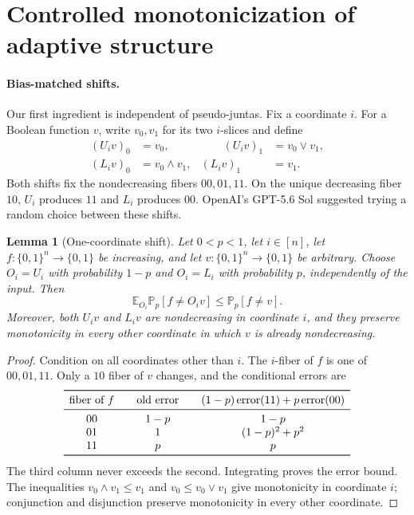 \documentclass[11pt,letterpaper]{article}
\newtheorem{lemma}[theorem]{Lemma}
\theoremstyle{definition}
\theoremstyle{remark}
\newcommand{\bits}{\{0,1\}}
\newcommand{\E}{\mathbb E}
\renewcommand{\Pr}{\mathbb P}
\begin{document}
\section{Controlled monotonicization of adaptive structure}
\label{sec:monotonicization}

\paragraph{Bias-matched shifts.}
Our first ingredient is independent of pseudo-juntas.  Fix a coordinate $i$.
For a Boolean function $v$, write $v_0,v_1$ for its two $i$-slices and define
\[
\begin{aligned}
  (U_i v)_0&=v_0, &\qquad (U_i v)_1&=v_0\vee v_1,\\
  (L_i v)_0&=v_0\wedge v_1, &(L_i v)_1&=v_1.
\end{aligned}
\]
Both shifts fix the nondecreasing fibers $00,01,11$.  On the unique decreasing
fiber $10$, $U_i$ produces $11$ and $L_i$ produces $00$.  OpenAI's
GPT-5.6 Sol suggested trying a random choice between these shifts.

\begin{lemma}[One-coordinate shift]
\label{lem:shift}
Let $0<p<1$, let $i\in[n]$, let $f:\bits^n\to\bits$ be increasing, and let
$v:\bits^n\to\bits$ be arbitrary.  Choose $O_i=U_i$ with probability $1-p$
and $O_i=L_i$ with probability $p$, independently of the input.  Then
\[
       \E_{O_i}\Pr_p[f\ne O_i v]\le\Pr_p[f\ne v].
\]
Moreover, both $U_i v$ and $L_i v$ are nondecreasing in coordinate $i$, and
they preserve monotonicity in every other coordinate in which $v$ is already
nondecreasing.
\end{lemma}

\begin{proof}
Condition on all coordinates other than $i$.  The $i$-fiber of $f$ is one of
$00,01,11$.  Only a $10$ fiber of $v$ changes, and the conditional errors are
\[
\begin{array}{c@{\qquad}c@{\qquad}c}
\toprule
\text{fiber of }f & \text{old error} &
 (1-p)\,\text{error}(11)+p\,\text{error}(00)\\
\midrule
00 & 1-p & 1-p\\
01 & 1   & (1-p)^2+p^2\\
11 & p   & p\\
\bottomrule
\end{array}
\]
The third column never exceeds the second.  Integrating proves the error
bound.  The inequalities $v_0\wedge v_1\le v_1$ and
$v_0\le v_0\vee v_1$ give monotonicity in coordinate $i$; conjunction and
disjunction preserve monotonicity in every other coordinate.
\end{proof}
\end{document}
